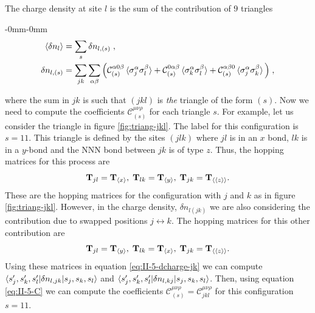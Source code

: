The charge density at site $l$  is the sum of the contribution of $9$ triangles%
\begin{adjustwidth}{-0mm}{-0mm}\vspace*{-5mm}
\begin{equation}
\begin{split}
        \braket{\delta n_l} &= \sum_s \delta n_{l,(s)} \; ,
        \\
    \delta n_{l,(s)} &= \sum_{jk}
    \sum_{\alpha\beta} \Big(  \mathcal{C}_{(s)}^{\alpha 0 \beta } \braket{\sigma_j^\alpha \sigma_l^\beta} +\mathcal{C}_{(s)}^{ 0 \alpha\beta } \braket{\sigma_k^\alpha \sigma_l^\beta} +
         \mathcal{C}_{(s)}^{   \alpha\beta 0 } \braket{\sigma_j^\alpha \sigma_k^\beta}  \Big) \; , \label{eq:II-5-density}
\end{split}
\end{equation}\end{adjustwidth}
where the sum in $jk$ is such that $(jkl)$ is \textit{the} triangle of the form $(s)$.
Now we need to compute the coefficients $ \mathcal{C}_{(s)}^{\mu\nu\rho} $ for each triangle $s$.
For example, let us consider the triangle in figure \ref{fig:triang-jkl}.
The label for this configuration is $s=11$.
This triangle is defined by the sites $(jlk)$ where $jl$ is in an $x$ bond, $lk$ is in a $y$-bond and the NNN bond between $jk$ is of type $z$. Thus,
the hopping matrices for this process are
\begin{equation}
    \mathbf{T}_{jl}  =    \mathbf{T}_{\braket{x}} ,    \;
    \mathbf{T}_{lk}  =    \mathbf{T}_{\braket{y}} , \;
    \mathbf{T}_{jk}  =    \mathbf{T}_{\braket{\braket{z}}}  .
\end{equation}
These are the hopping matrices for the configuration with $j$ and $k$ as in figure \ref{fig:triang-jkl}. However, in the charge density, $\delta n_{l (jk)}$ we are also considering the contribution due to swapped positions $j \leftrightarrow k$. The hopping matrices for this other contribution are
\begin{equation}
    \mathbf{T}_{jl}  =    \mathbf{T}_{\braket{y}} ,    \;
    \mathbf{T}_{lk}  =    \mathbf{T}_{\braket{x}} , \;
    \mathbf{T}_{jk}  =    \mathbf{T}_{\braket{\braket{z}}}  .
\end{equation}
Using these matrices in equation \eqref{eq:II-5-dcharge-jk} we can compute $\braket{s_j',s_k',s_l' | \delta n_{l,jk} | s_j, s_k, s_l}$ and
$\braket{s_j',s_k',s_l' | \delta n_{l,kj} | s_j, s_k, s_l}$. Then, using equation \eqref{eq:II-5-C} we can compute the coefficients $\mathcal{C}_{(s)}^{\mu\nu\rho}=\mathcal{C}_{jkl}^{\mu\nu\rho}$ for this configuration $s=11$.

